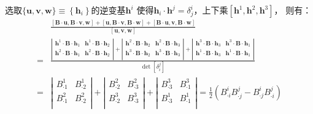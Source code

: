 \documentclass[UTF8,zihao=5]{ctexart}
\newcommand{\bm}[1]{{\mathbf{#1}}}
\begin{document}
选取$\{\bm{u},\bm{v},\bm{w}\}\equiv\left\{\bm{h}_i\right\}$的逆变基$\bm{h}^i$
使得$\bm{h}_i\cdot\bm{h}^j=\delta^i_j$，上下乘$[\bm{h}^1,\bm{h}^2,\bm{h}^3]$，
则有：
\begin{equation}
    \begin{aligned}
          & \frac{
        [\bm{B}\cdot\bm{u}, \bm{B}\cdot\bm{v}, \bm{w}]+
        [\bm{u}, \bm{B}\cdot\bm{v}, \bm{B}\cdot\bm{w}]+
        [\bm{B}\cdot\bm{u}, \bm{v}, \bm{B}\cdot\bm{w}]}{[\bm{u}, \bm{v}, \bm{w}]}
        \\
        = &
        \frac{
            \left|
            \begin{matrix}
                \bm{h}^1\cdot\bm{B}\cdot\bm{h}_1 & \bm{h}^1\cdot\bm{B}\cdot\bm{h}_2 \\
                \bm{h}^2\cdot\bm{B}\cdot\bm{h}_1 & \bm{h}^2\cdot\bm{B}\cdot\bm{h}_2 \\
            \end{matrix}
            \right|
            +
            \left|
            \begin{matrix}
                \bm{h}^2\cdot\bm{B}\cdot\bm{h}_2 & \bm{h}^2\cdot\bm{B}\cdot\bm{h}_3 \\
                \bm{h}^3\cdot\bm{B}\cdot\bm{h}_2 & \bm{h}^3\cdot\bm{B}\cdot\bm{h}_3 \\
            \end{matrix}
            \right|
            +
            \left|
            \begin{matrix}
                \bm{h}^3\cdot\bm{B}\cdot\bm{h}_3 & \bm{h}^3\cdot\bm{B}\cdot\bm{h}_1 \\
                \bm{h}^1\cdot\bm{B}\cdot\bm{h}_3 & \bm{h}^1\cdot\bm{B}\cdot\bm{h}_1 \\
            \end{matrix}
            \right|
        }{\det{[\delta_i^j]}} \\
        = &
        \left|
        \begin{matrix}
            B^1_{\cdot1} & B^1_{\cdot2} \\
            B^2_{\cdot1} & B^2_{\cdot2} \\
        \end{matrix}
        \right|
        +
        \left|
        \begin{matrix}
            B^2_{\cdot2} & B^2_{\cdot3} \\
            B^3_{\cdot2} & B^3_{\cdot3} \\
        \end{matrix}
        \right|
        +
        \left|
        \begin{matrix}
            B^3_{\cdot3} & B^3_{\cdot1} \\
            B^1_{\cdot3} & B^1_{\cdot1} \\
        \end{matrix}
        \right|
        =\frac{1}{2}\left(B^i_{\cdot i}B^j_{\cdot j}-B^i_{\cdot j}B^j_{\cdot i}\right)
    \end{aligned}
\end{equation}
\end{document}
